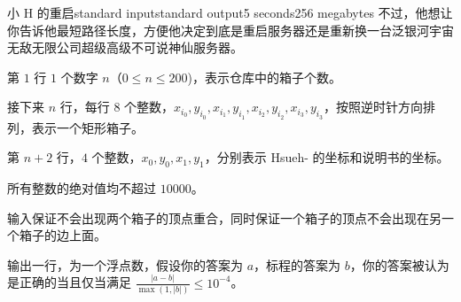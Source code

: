 \begin{problem}{小 H 的重启}{standard input}{standard output}{5 seconds}{256 megabytes}
不过，他想让你告诉他最短路径长度，方便他决定到底是重启服务器还是重新换一台泛银河宇宙无敌无限公司超级高级不可说神仙服务器。



\InputFile
第 $1$ 行 $1$ 个数字 $n$（$0 \leqslant n \leqslant 200$)，表示仓库中的箱子个数。

接下来 $n$ 行，每行 $8$ 个整数，$x_{i_0},y_{i_0},x_{i_1},y_{i_1},x_{i_2},y_{i_2},x_{i_3},y_{i_3}$，按照逆时针方向排列，表示一个矩形箱子。

第 $n+2$ 行，$4$ 个整数，$x_0,y_0,x_1,y_1$，分别表示 Hsueh- 的坐标和说明书的坐标。

所有整数的绝对值均不超过 $10000$。

输入保证不会出现两个箱子的顶点重合，同时保证一个箱子的顶点不会出现在另一个箱子的边上面。

\OutputFile
输出一行，为一个浮点数，假设你的答案为 $a$，标程的答案为 $b$，你的答案被认为是正确的当且仅当满足 $\frac{|a - b|}{\max{(1, |b|)}} \le 10^{-4}$。


\Example

\begin{example}
%
\end{example}

\end{problem}

